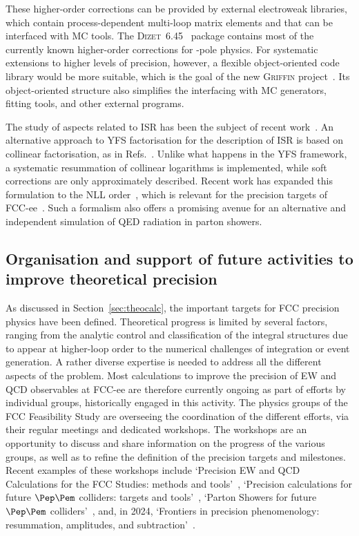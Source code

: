 These higher-order corrections can be provided by external electroweak libraries, 
which contain process-dependent multi-loop matrix elements 
and that can be interfaced with MC tools. 
The \textsc{Dizet~6.45}~\cite{Arbuzov:2023afc} package contains most of the currently known higher-order corrections for \PZ-pole physics. 
For systematic extensions to higher levels of precision, however, a flexible object-oriented code library would be more suitable, 
which is the goal of the new \textsc{Griffin} project~\cite{Chen:2022dow}. 
Its object-oriented structure also simplifies the interfacing with MC generators, fitting tools, and other external programs.

The study of aspects related to ISR has been the subject of recent work~\cite{Frixione:2022ofv}.
An alternative approach to YFS factorisation for the description of ISR is based on collinear factorisation, 
as in Refs.~\cite{Frixione:2012wtz,Frixione:2021zdp,Bertone:2022ktl}. 
Unlike what happens in the YFS framework, a systematic resummation of collinear logarithms is implemented, 
while soft corrections are only approximately described. 
Recent work has expanded this formulation to the NLL order~\cite{Frixione:2019lga,Bertone:2019hks}, 
which is relevant for the precision targets of FCC-ee~\cite{Bertone:2022ktl}. 
Such a formalism also offers a promising avenue for an alternative and independent simulation of QED radiation in parton showers.

\subsection{Organisation and support of future activities to improve theoretical precision}

As discussed in Section~\ref{sec:theocalc}, the important targets for FCC precision physics have been defined. 
Theoretical progress is limited by several factors, 
ranging from the analytic control and classification of the integral structures due to appear at higher-loop order 
to the numerical challenges of integration or event generation. 
A rather diverse expertise is needed to address all the different aspects of the problem. 
Most calculations to improve the precision of EW and QCD observables at FCC-ee are therefore currently ongoing as part of efforts by individual groups, 
historically engaged in this activity. 
The physics groups of the FCC Feasibility Study are overseeing the coordination of the different efforts, via their regular meetings and dedicated workshops. 
The workshops are an opportunity to discuss and share information on the progress of the various groups, 
as well as to refine the definition of the precision targets and milestones. 
Recent examples of these workshops include 
`Precision EW and QCD Calculations for the FCC Studies: methods and tools'~\cite{Blondel:2018mad}, 
`Precision calculations for future $\epem$ colliders: targets and tools'~\cite{EWPrecisionWshop},
`Parton Showers for future $\epem$ colliders'~\cite{QCDPrecisionWshop}, and, in 2024,
`Frontiers in precision phenomenology: resummation, amplitudes, and subtraction'~\cite{QCDFrontiersWshop}.

